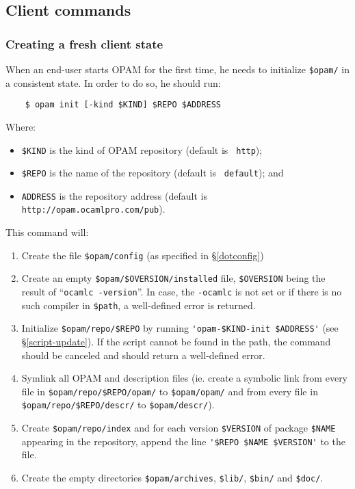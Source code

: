 \documentclass[a4paper,11pt]{article}
\begin{document}
\subsection{Client commands}

\subsubsection{Creating a fresh client state}
\label{opam-init}

When an end-user starts OPAM for the first time, he needs to
initialize \verb+$opam/+ in a consistent state. In order to do so, he
should run:

\begin{verbatim}
    $ opam init [-kind $KIND] $REPO $ADDRESS
\end{verbatim}

Where:
\begin{itemize}
\item \verb+$KIND+ is the kind of OPAM repository (default is {\tt
  http});
\item \verb+$REPO+ is the name of the repository (default is {\tt
  default}); and
\item \verb+ADDRESS+ is the repository address (default is
  \verb+http://opam.ocamlpro.com/pub+).
\end{itemize}

This command will:

\begin{enumerate}

\item Create the file \verb+$opam/config+ (as specified in
  \S\ref{dotconfig})

\item Create an empty \verb+$opam/$OVERSION/installed+ file,
  \verb+$OVERSION+ being the result of ``{\tt ocamlc -version}''.
  In case, the \verb+-ocamlc+ is not set or if there is no such 
  compiler in \verb+$path+, a well-defined error is returned.

\item Initialize \verb+$opam/repo/$REPO+ by running
  \verb+'opam-$KIND-init $ADDRESS'+ (see \S\ref{script-update}). If
  the script cannot be found in the path, the command should be
  canceled and should return a well-defined error.

\item Symlink all OPAM and description files (ie. create a symbolic
  link from every file in \verb+$opam/repo/$REPO/opam/+ to
  \verb+$opam/opam/+ and from every file in
  \verb+$opam/repo/$REPO/descr/+ to \verb+$opam/descr/+).

\item Create \verb+$opam/repo/index+ and for each version
  \verb+$VERSION+ of package \verb+$NAME+ appearing in the repository,
  append the line \verb+'$REPO $NAME $VERSION'+ to the file.

\item Create the empty directories \verb+$opam/archives+,
  \verb+$lib/+, \verb+$bin/+ and \verb+$doc/+.

\end{enumerate}
\end{document}
